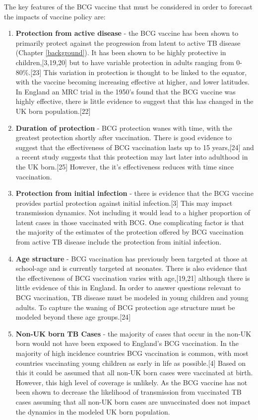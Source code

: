 \documentclass[11pt,twoside]{bristolthesis}
\begin{document}
  The key features of the BCG vaccine that must be considered in order to forecast the impacts of vaccine policy are:
  \begin{enumerate}
  \def\labelenumi{\arabic{enumi}.}
  \item
    \textbf{Protection from active disease} - the BCG vaccine has been shown to primarily protect against the progression from latent to active TB disease (Chapter \ref{background}). It has been shown to be highly protective in children,{[}3,19,20{]} but to have variable protection in adults ranging from 0-80\%.{[}23{]} This variation in protection is thought to be linked to the equator, with the vaccine becoming increasing effective at higher, and lower latitudes. In England an MRC trial in the 1950's found that the BCG vaccine was highly effective, there is little evidence to suggest that this has changed in the UK born population.{[}22{]}
  \item
    \textbf{Duration of protection} - BCG protection wanes with time, with the greatest protection shortly after vaccination. There is good evidence to suggest that the effectiveness of BCG vaccination lasts up to 15 years,{[}24{]} and a recent study suggests that this protection may last later into adulthood in the UK born.{[}25{]} However, the it's effectiveness reduces with time since vaccination.
  \item
    \textbf{Protection from initial infection} - there is evidence that the BCG vaccine provides partial protection against initial infection.{[}3{]} This may impact transmission dynamics. Not including it would lead to a higher proportion of latent cases in those vaccinated with BCG. One complicating factor is that the majority of the estimates of the protection offered by BCG vaccination from active TB disease include the protection from initial infection.
  \item
    \textbf{Age structure} - BCG vaccination has previously been targeted at those at school-age and is currently targeted at neonates. There is also evidence that the effectiveness of BCG vaccination varies with age,{[}19,21{]} although there is little evidence of this in England. In order to answer questions relevant to BCG vaccination, TB disease must be modeled in young children and young adults. To capture the waning of BCG protection age structure must be modeled beyond these age groups.{[}24{]}
  \item
    \textbf{Non-UK born TB Cases} - the majority of cases that occur in the non-UK born would not have been exposed to England's BCG vaccination. In the majority of high incidence countries BCG vaccination is common, with most countries vaccinating young children as early in life as possible.{[}4{]} Based on this it could be assumed that all non-UK born cases were vaccinated at birth. However, this high level of coverage is unlikely. As the BCG vaccine has not been shown to decrease the likelihood of transmission from vaccinated TB cases assuming that all non-UK born cases are unvaccinated does not impact the dynamics in the modeled UK born population.

\end{enumerate}
\end{document}
